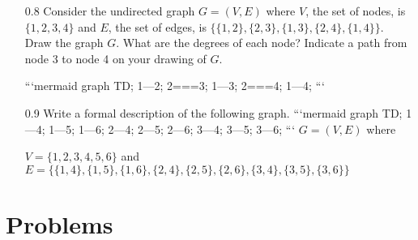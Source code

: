\documentclass[12pt, a4paper]{article}
\begin{document}
\begin{enumerate}
    \item[0.8]
Consider the undirected graph $G = (V, E)$ where $V$, the set of nodes, is $\{1, 2, 3, 4\}$ and $E$, the set of edges, is $\{\{1, 2\}, \{2, 3\}, \{1, 3\}, \{2, 4\}, \{1, 4\}\}$. Draw the graph $G$. What are the degrees of each node? Indicate a path from node 3 to node 4 on your drawing of $G$.

```mermaid
graph TD;
    1---2;
    2===3;
    1---3;
    2===4;
    1---4;
```

    \item[0.9]
Write a formal description of the following graph.
```mermaid
graph TD;
    1---4;
    1---5;
    1---6;
    2---4;
    2---5;
    2---6;
    3---4;
    3---5;
    3---6;
```
$G = (V, E)$ where 

$V = \{1, 2, 3, 4, 5, 6\}$ and $E = \{\{1, 4\}, \{1, 5\}, \{1, 6\}, \{2, 4\}, \{2, 5\}, \{2, 6\}, \{3, 4\}, \{3, 5\}, \{3, 6\}\}$
\end{enumerate}
\section{Problems}
\end{document}
